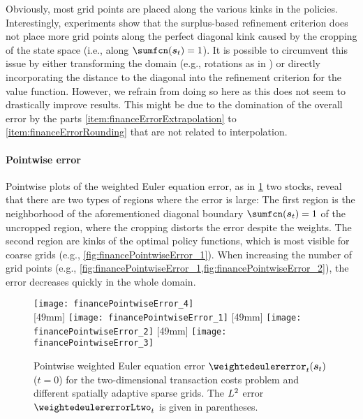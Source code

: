 Obviously, most grid points are placed along the various kinks in the
policies.
Interestingly, experiments show that the surplus-based refinement
criterion does not place more grid points along the perfect diagonal kink
caused by the cropping of the state space
(i.e., along $\sumfcn(\vstock_t) = 1$).
It is possible to circumvent this issue by either
transforming the domain (e.g., rotations as in \cite{Bohn18Optimally}) or
directly incorporating the distance to the diagonal into the
refinement criterion for the value function.
However, we refrain from doing so here as this does not seem to
drastically improve results.
This might be due to the domination of the overall error by
the parts \ref{item:financeErrorExtrapolation} to
\ref{item:financeErrorRounding} that are not related to interpolation.

\paragraph{Pointwise error}

Pointwise plots of the weighted Euler equation error,
as in \cref{fig:financePointwiseError} two stocks,
reveal that there are two types of regions where the error is large:
The first region is the neighborhood of the aforementioned diagonal boundary
$\sumfcn(\vstock_t) = 1$ of the uncropped region,
where the cropping distorts the error despite the weights.
The second region are kinks of the optimal policy functions,
which is most visible for coarse grids
(e.g., \cref{fig:financePointwiseError_1}).
When increasing the number of grid points
(e.g., \cref{fig:financePointwiseError_1,fig:financePointwiseError_2}),
the error decreases quickly in the whole domain.

\begin{figure}
  \texttt{[image: financePointwiseError\_4]}%
  \\[2mm]%
  [49mm]{%
    \texttt{[image: financePointwiseError\_1]}%
  }%
  \hfill%
  [49mm]{%
    \texttt{[image: financePointwiseError\_2]}%
  }%
  \hfill%
  [49mm]{%
    \texttt{[image: financePointwiseError\_3]}%
  }%
  \caption[Pointwise weighted Euler equation error for different grids]{%
    Pointwise weighted Euler equation error $\weightedeulererror_t(\vstock_t)$
    ($t = 0$) for the two-dimensional transaction costs problem and
    different spatially adaptive sparse grids.
    The $L^2$ error $\weightedeulererrorLtwo_t$ is given in
    parentheses.%
  }%
  \label{fig:financePointwiseError}%
\end{figure}


